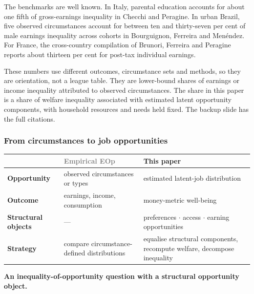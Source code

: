 \documentclass[10pt,aspectratio=169]{beamer}
\begin{document}
\begin{frame}
{The benchmarks are well known. In Italy, parental education accounts for about
one fifth of gross-earnings inequality in Checchi and Peragine. In urban Brazil,
five observed circumstances account for between ten and thirty-seven per cent of
male earnings inequality across cohorts in Bourguignon, Ferreira and Men\'endez.
For France, the cross-country compilation of Brunori, Ferreira and Peragine
reports about thirteen per cent for post-tax individual earnings.

These numbers use different outcomes, circumstance sets and methods, so they are
orientation, not a league table. They are lower-bound shares of earnings or income
inequality attributed to observed circumstances. The share in this paper is a
share of welfare inequality associated with estimated latent opportunity
components, with household resources and needs held fixed. The backup slide
has the full citations.}
\end{frame}

\begin{frame}
\frametitle{From circumstances to job opportunities}
\hypertarget{main:eopjobs}{}
\vfill
\begin{center}\small
\renewcommand{\arraystretch}{1.55}
\begin{tabular}{>{\bfseries}l >{\raggedright\arraybackslash}p{} >{\raggedright\arraybackslash}p{}}
 & \textcolor{gray}{\textbf{Empirical EOp}} & \textcolor{chacc}{\textbf{This paper}} \\
\midrule
Opportunity & observed circumstances or types & estimated latent-job distribution \\
Outcome & earnings, income, consumption & money-metric well-being \\
Structural objects & --- & preferences $\cdot$ access $\cdot$ earning opportunities \\
Strategy & compare circumstance-defined distributions & equalise structural components, recompute welfare, decompose inequality \\
\end{tabular}
\end{center}
\vfill
\begin{center}
{\large\bfseries An inequality-of-opportunity question with a structural opportunity object.}
\end{center}
\vfill
{}
\end{frame}
\end{document}
